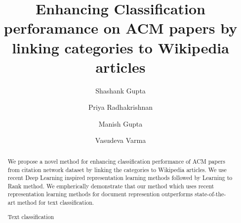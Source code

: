 \documentclass[runningheads,a4paper]{llncs}
\newcommand{\keywords}[1]{\par\addvspace\baselineskip
\noindent\keywordname\enspace\ignorespaces#1}
\begin{document}
\mainmatter  %

\title{Enhancing Classification perforamance on ACM papers by linking categories to Wikipedia articles}

\titlerunning{}

%
%
\author{Shashank Gupta
\and Priya Radhakrishnan\and Manish Gupta\and Vasudeva Varma}
%


%
%

\maketitle


\begin{abstract}
We propose a novel method for enhancing classification performance of ACM papers from citation network dataset by linking the categories to Wikipedia articles. We use recent Deep Learning inspired representation learning methods followed by Learning to Rank method. We empherically demonstrate that our method which uses recent representation learning methods for document represention outperforms state-of-the-art method for text classification.
\keywords{Text classification}
\end{abstract}
\end{document}
